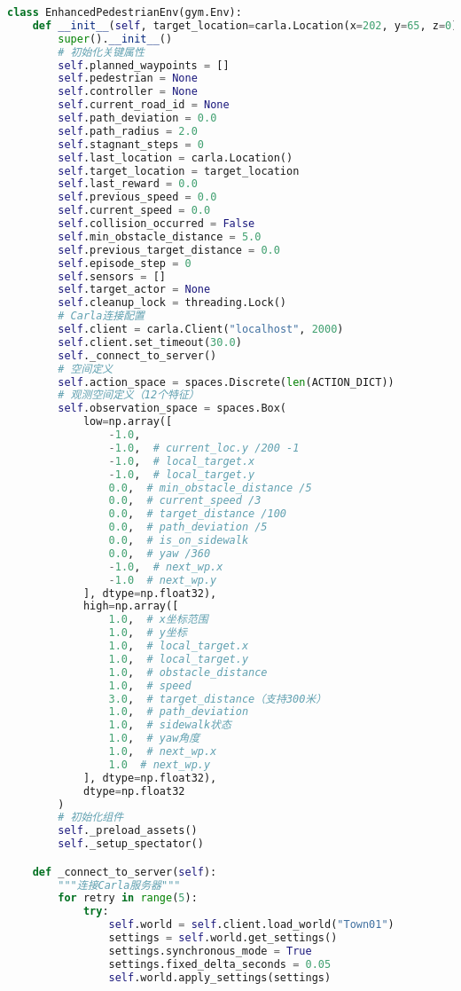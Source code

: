 \begin{lstlisting}[language=Python]
class EnhancedPedestrianEnv(gym.Env):
    def __init__(self, target_location=carla.Location(x=202, y=65, z=0)):
        super().__init__()
        # 初始化关键属性
        self.planned_waypoints = []
        self.pedestrian = None
        self.controller = None
        self.current_road_id = None
        self.path_deviation = 0.0
        self.path_radius = 2.0
        self.stagnant_steps = 0
        self.last_location = carla.Location()
        self.target_location = target_location
        self.last_reward = 0.0
        self.previous_speed = 0.0
        self.current_speed = 0.0
        self.collision_occurred = False
        self.min_obstacle_distance = 5.0
        self.previous_target_distance = 0.0
        self.episode_step = 0
        self.sensors = []
        self.target_actor = None
        self.cleanup_lock = threading.Lock()
        # Carla连接配置
        self.client = carla.Client("localhost", 2000)
        self.client.set_timeout(30.0)
        self._connect_to_server()
        # 空间定义
        self.action_space = spaces.Discrete(len(ACTION_DICT))
        # 观测空间定义（12个特征）
        self.observation_space = spaces.Box(
            low=np.array([
                -1.0,
                -1.0,  # current_loc.y /200 -1
                -1.0,  # local_target.x
                -1.0,  # local_target.y
                0.0,  # min_obstacle_distance /5
                0.0,  # current_speed /3
                0.0,  # target_distance /100
                0.0,  # path_deviation /5
                0.0,  # is_on_sidewalk
                0.0,  # yaw /360
                -1.0,  # next_wp.x
                -1.0  # next_wp.y
            ], dtype=np.float32),
            high=np.array([
                1.0,  # x坐标范围
                1.0,  # y坐标
                1.0,  # local_target.x
                1.0,  # local_target.y
                1.0,  # obstacle_distance
                1.0,  # speed
                3.0,  # target_distance（支持300米）
                1.0,  # path_deviation
                1.0,  # sidewalk状态
                1.0,  # yaw角度
                1.0,  # next_wp.x
                1.0  # next_wp.y
            ], dtype=np.float32),
            dtype=np.float32
        )
        # 初始化组件
        self._preload_assets()
        self._setup_spectator()

    def _connect_to_server(self):
        """连接Carla服务器"""
        for retry in range(5):
            try:
                self.world = self.client.load_world("Town01")
                settings = self.world.get_settings()
                settings.synchronous_mode = True
                settings.fixed_delta_seconds = 0.05
                self.world.apply_settings(settings)


\end{lstlisting}

